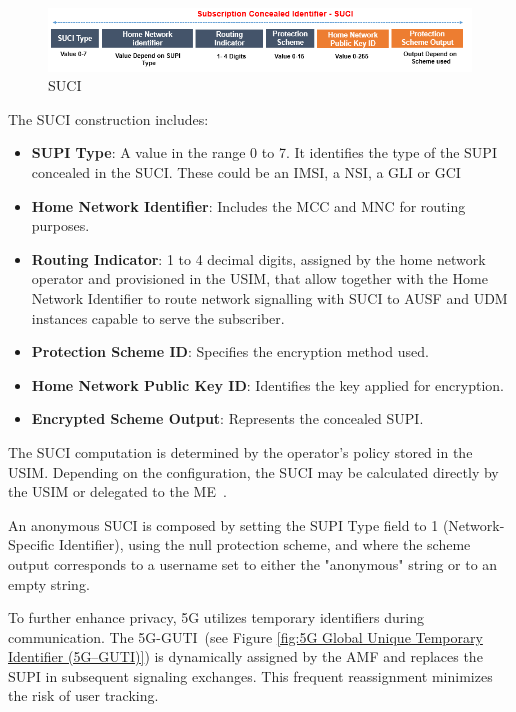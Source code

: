\begin{figure}
    \centering
    \includegraphics[width=0.75\linewidth]{figs/Subscription Concealed Identifier (SUCI).png}
    \caption{\acs{SUCI}}
    \label{fig:Subscription Concealed Identifier (SUCI)}
\end{figure}

The \ac{SUCI} construction includes:
\begin{itemize}
    \item{
        \textbf{\ac{SUPI} Type}: A value in the range 0 to 7. It identifies the type of the \ac{SUPI} concealed in the \ac{SUCI}. These could be an \ac{IMSI}, a \ac{NSI}, a \ac{GLI} or \ac{GCI}
    }
    \item{
        \textbf{Home Network Identifier}: Includes the \ac{MCC} and \ac{MNC} for routing purposes.
    }
    \item{
        \textbf{Routing Indicator}: 1 to 4 decimal digits, assigned by the home network operator and provisioned in the \ac{USIM}, that allow together with the Home Network Identifier to route network signalling with \ac{SUCI} to \ac{AUSF} and \ac{UDM} instances capable to serve the subscriber.
    }
    \item{
        \textbf{Protection Scheme ID}: Specifies the encryption method used.
    }
    \item{
        \textbf{Home Network Public Key ID}: Identifies the key applied for encryption.
    }
    \item{
        \textbf{Encrypted Scheme Output}: Represents the concealed \ac{SUPI}.
    }
\end{itemize}

The \ac{SUCI} computation is determined by the operator's policy stored in the \ac{USIM}. Depending on the configuration, the \ac{SUCI} may be calculated directly by the \ac{USIM} or delegated to the \ac{ME}~\cite{23.003-p21}.

An anonymous \ac{SUCI} is composed by setting the \ac{SUPI} Type field to 1 (Network-Specific Identifier), using the null protection scheme, and where the scheme output corresponds to a username set to either the "anonymous" string or to an empty string.

To further enhance privacy, \ac{5G} utilizes temporary identifiers during communication. The \acl{5G-GUTI}~\cite{23.501-p244}(see Figure \ref{fig:5G Global Unique Temporary Identifier (5G–GUTI)}) is dynamically assigned by the \ac{AMF} and replaces the \ac{SUPI} in subsequent signaling exchanges. This frequent reassignment minimizes the risk of user tracking.

